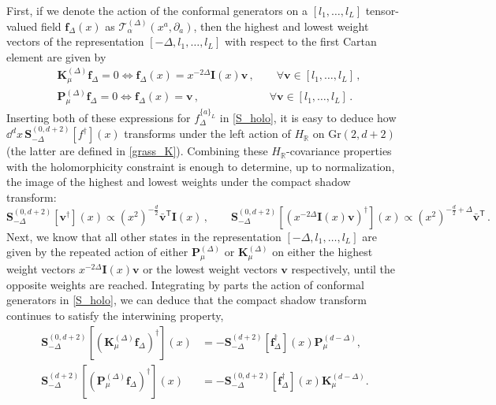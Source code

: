 \documentclass{article}
\def \Dg {\Delta}
\def \ds {\partial}
\def \ag {\alpha}
\def \Rs {\mathbb{R}}
\newcommand\vct[1]{\mathbf{#1}}
\begin{document}
     
     First, if we denote the action of the conformal generators on a $[l_1,\dots,l_L]$ tensor-valued field $\vct{f}_{\Dg}(x)$ as $\mathcal{T}_{\ag}^{(\Dg)}(x^a,\ds_a)$, then the highest and lowest weight vectors of the representation $[-\Dg,l_1,\dots,l_L]$ with respect to the first Cartan element are given by
     \begin{align*}
     & \vct{K}^{(\Dg)}_{\mu} \vct{f}_{\Dg} = 0 \iff \vct{f}_{\Dg}(x) = x^{-2\Dg} \vct{I}(x) \vct{v}\,, \qquad \forall \vct{v} \in [l_1,\dots ,l_L]\,, \\
     & \vct{P}^{(\Dg)}_{\mu} \vct{f}_{\Dg} = 0 \iff \vct{f}_{\Dg}(x) = \vct{v}\,, \qquad \qquad \qquad \,\, \forall \vct{v} \in [l_1,\dots ,l_L]\,.
     \end{align*}
     Inserting both of these expressions for $f_{\Delta}^{\{a\}_L}$ in \eqref{S_holo}, it is easy to deduce how $\dd^d x\, \mathbf{S}_{-\Dg}^{(0,d+2)}[f^{\dagger}](x)$ transforms under the left action of $H_{\Rs}$ on $\mathrm{Gr}(2,d+2)$ (the latter are defined in \eqref{grass_K}). Combining these $H_{\Rs}$-covariance properties with the holomorphicity constraint is enough to determine, up to normalization, the image of the highest and lowest weights under the compact shadow transform:
     \begin{equation*}
     \mathbf{S}^{(0,d+2)}_{-\Dg}[ \vct{v}^{\dagger}](x) \propto (x^2)^{-\frac{d}{2}} \bar{\vct{v}}^{\mathsf{T}} \vct{I}(x)\,, \qquad  \mathbf{S}^{(0,d+2)}_{-\Dg}[\left( x^{-2\Dg} \vct{I}(x) \vct{v} \right)^{\dagger} ](x) \propto (x^2)^{-\frac{d}{2}+\Dg} \bar{\vct{v}}^{\mathsf{T}}\,.
     \end{equation*}
     Next, we know that all other states in the representation $[-\Dg,l_1,\dots,l_L]$ are given by the repeated action of either $\vct{P}^{(\Dg)}_{\mu}$ or $\vct{K}^{(\Dg)}_{\mu}$ on either the highest weight vectors $x^{-2\Dg} \vct{I}(x) \vct{v}$ or the lowest weight vectors $\vct{v}$ respectively, until the opposite weights are reached. Integrating by parts the action of conformal generators in \eqref{S_holo}, we can deduce that the compact shadow transform continues to satisfy the interwining property,
     \begin{align*}
         \mathbf{S}^{(0,d+2)}_{-\Dg}[(\vct{K}^{(\Dg)}_{\mu} \vct{f}_{\Dg})^{\dagger}](x) &= - \mathbf{S}^{(d+2)}_{-\Dg}[\vct{f}_{\Dg}^{\dagger}](x) \vct{P}_{\mu}^{(d-\Dg)}, \\        \mathbf{S}^{(d+2)}_{-\Dg}[(\vct{P}^{(\Dg)}_{\mu} \vct{f}_{\Dg})^{\dagger}](x) &= - \mathbf{S}^{(0,d+2)}_{-\Dg}[\vct{f}_{\Dg}^{\dagger}](x) \vct{K}_{\mu}^{(d-\Dg)}.
     \end{align*}
\end{document}
